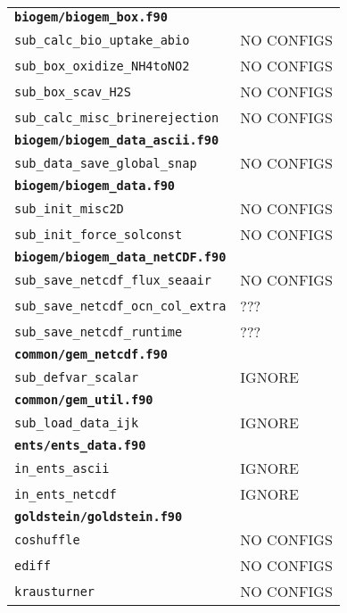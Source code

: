 \documentclass[a4paper,10pt,article]{memoir}
\begin{document}
\begin{tabular}{ll}
  \multicolumn{2}{l}{\textbf{\texttt{biogem/biogem\_box.f90}}} \\
  \texttt{sub\_calc\_bio\_uptake\_abio}    & NO CONFIGS \\
  \texttt{sub\_box\_oxidize\_NH4toNO2}     & NO CONFIGS \\
  \texttt{sub\_box\_scav\_H2S}             & NO CONFIGS \\
  \texttt{sub\_calc\_misc\_brinerejection} & NO CONFIGS \\

  \multicolumn{2}{l}{\textbf{\texttt{biogem/biogem\_data\_ascii.f90}}} \\
  \texttt{sub\_data\_save\_global\_snap} & NO CONFIGS \\

  \multicolumn{2}{l}{\textbf{\texttt{biogem/biogem\_data.f90}}} \\
  \texttt{sub\_init\_misc2D}          & NO CONFIGS \\
  \texttt{sub\_init\_force\_solconst} & NO CONFIGS \\

  \multicolumn{2}{l}{\textbf{\texttt{biogem/biogem\_data\_netCDF.f90}}} \\
  \texttt{sub\_save\_netcdf\_flux\_seaair}    & NO CONFIGS \\
  \texttt{sub\_save\_netcdf\_ocn\_col\_extra} & ??? \\
  \texttt{sub\_save\_netcdf\_runtime}         & ??? \\

  \multicolumn{2}{l}{\textbf{\texttt{common/gem\_netcdf.f90}}} \\
  \texttt{sub\_defvar\_scalar} & IGNORE \\

  \multicolumn{2}{l}{\textbf{\texttt{common/gem\_util.f90}}} \\
  \texttt{sub\_load\_data\_ijk} & IGNORE \\

  \multicolumn{2}{l}{\textbf{\texttt{ents/ents\_data.f90}}} \\
  \texttt{in\_ents\_ascii}  & IGNORE \\
  \texttt{in\_ents\_netcdf} & IGNORE \\

  \multicolumn{2}{l}{\textbf{\texttt{goldstein/goldstein.f90}}} \\
  \texttt{coshuffle}   & NO CONFIGS \\
  \texttt{ediff}       & NO CONFIGS \\
  \texttt{krausturner} & NO CONFIGS \\


\end{tabular}
\end{document}
